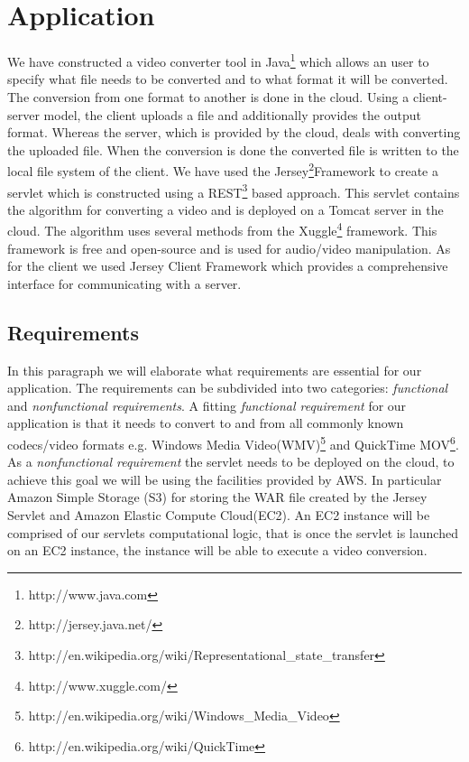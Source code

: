 \section{Application}
\label{sec:appl}
We have constructed a video converter tool in Java\footnote{http://www.java.com} which allows an user to specify what file needs to be converted and to what format it will be converted. 
The conversion from one format to another is done in the cloud. 
Using a client-server model, the client uploads  a file and additionally provides the output format. 
Whereas the server, which is provided by the cloud, deals with converting the uploaded file. 
When the conversion is done the converted file is written to the local file system of the client. 
We have used the Jersey\footnote{http://jersey.java.net/}Framework to create a servlet which is constructed using a REST\footnote{http://en.wikipedia.org/wiki/Representational\_state\_transfer} based approach. 
This servlet contains the algorithm for converting a video and is deployed on a Tomcat server in the cloud. 
The algorithm uses several methods from the Xuggle\footnote{http://www.xuggle.com/} framework.
This framework  is  free and open-source and is used for audio/video manipulation. 
As for the client we used Jersey Client Framework which provides a comprehensive interface for communicating with a server.
\pagebreak[1]  
\subsection{Requirements}
In this paragraph we will elaborate what requirements are essential for our application. 
The requirements can be subdivided into two categories: \emph{functional} and \emph{nonfunctional requirements}. 
A fitting \emph{functional requirement} for our application is that it needs to convert to and from  all commonly known codecs/video formats 
e.g. Windows Media Video(WMV)\footnote{http://en.wikipedia.org/wiki/Windows\_Media\_Video} 
and QuickTime MOV\footnote{http://en.wikipedia.org/wiki/QuickTime}.  
As a \emph{nonfunctional requirement} the servlet needs to be deployed on the cloud, to achieve this goal we will be using the facilities provided by AWS. 
In particular Amazon  Simple Storage (S3) for storing the WAR file created by the Jersey Servlet and Amazon Elastic Compute Cloud(EC2). 
An EC2 instance will be comprised of our servlets computational logic, that is once the servlet is launched on an EC2 instance, the instance will be able to execute a video conversion.
 

